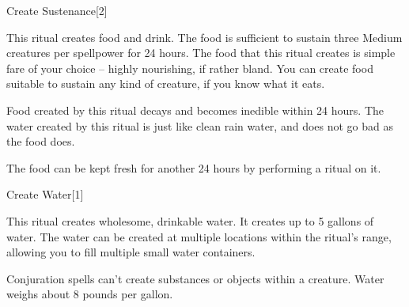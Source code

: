 \begin{spellsection}{Create Sustenance}[2]
    \begin{spellheader}
    \end{spellheader}
    \begin{spellcontent}
        \begin{spelltargetinginfo}
            \spellrng{\rngclose}
        \end{spelltargetinginfo}
        \begin{spelleffects}
            \spelleffect This ritual creates food and drink. The food is sufficient to sustain three Medium creatures per spellpower for 24 hours. The food that this ritual creates is simple fare of your choice -- highly nourishing, if rather bland. You can create food suitable to sustain any kind of creature, if you know what it eats.

            Food created by this ritual decays and becomes inedible within 24 hours. The water created by this ritual is just like clean rain water, and does not go bad as the food does.
        \end{spelleffects}
    \end{spellcontent}
    \begin{spellfooter}
        \spellnotes The food can be kept fresh for another 24 hours by performing a  ritual on it.
    \end{spellfooter}
\end{spellsection}

\begin{spellsection}{Create Water}[1]
    \begin{spellheader}
    \end{spellheader}
    \begin{spellcontent}
        \begin{spelltargetinginfo}
            \spellrng{\rngclose}
        \end{spelltargetinginfo}
        \begin{spelleffects}
            \spelleffect This ritual creates wholesome, drinkable water. It creates up to 5 gallons of water. The water can be created at multiple locations within the ritual's range, allowing you to fill multiple small water containers.
        \end{spelleffects}
    \end{spellcontent}
    \begin{spellfooter}
        \spellnotes Conjuration spells can't create substances or objects within a creature. Water weighs about 8 pounds per gallon.
    \end{spellfooter}
\end{spellsection}

